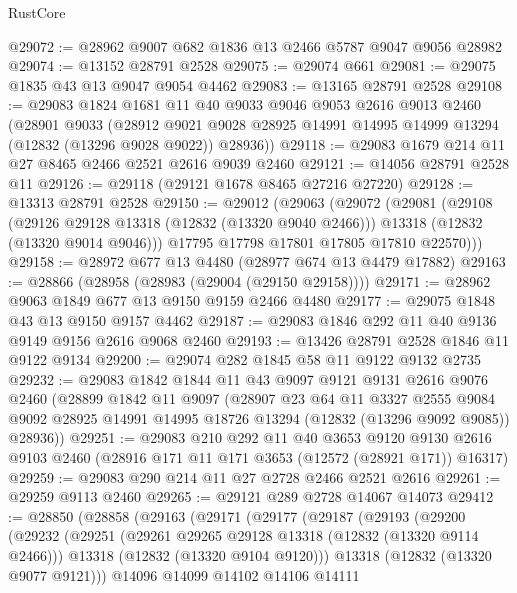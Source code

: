 \begin{lexlean}{RustCore}
\begin{coremodule}
@29072 := @28962 @9007 @682 @1836 @13 @2466 @5787 @9047 @9056 @28982
@29074 := @13152 @28791 @2528
@29075 := @29074 @661
@29081 := @29075 @1835 @43 @13 @9047 @9054 @4462
@29083 := @13165 @28791 @2528
@29108 := @29083
    @1824
    @1681
    @11
    @40
    @9033
    @9046
    @9053
    @2616
    @9013
    @2460
    (@28901
      @9033
      (@28912 @9021 @9028 @28925 @14991 @14995 @14999 @13294 (@12832 (@13296 @9028 @9022)) @28936))
@29118 := @29083 @1679 @214 @11 @27 @8465 @2466 @2521 @2616 @9039 @2460
@29121 := @14056 @28791 @2528 @11
@29126 := @29118 (@29121 @1678 @8465 @27216 @27220)
@29128 := @13313 @28791 @2528
@29150 := @29012
    (@29063
      (@29072
        (@29081
          (@29108
            (@29126 @29128 @13318 (@12832 (@13320 @9040 @2466)))
            @13318
            (@12832 (@13320 @9014 @9046)))
          @17795
          @17798
          @17801
          @17805
          @17810
          @22570)))
@29158 := @28972 @677 @13 @4480 (@28977 @674 @13 @4479 @17882)
@29163 := @28866 (@28958 (@28983 (@29004 (@29150 @29158))))
@29171 := @28962 @9063 @1849 @677 @13 @9150 @9159 @2466 @4480
@29177 := @29075 @1848 @43 @13 @9150 @9157 @4462
@29187 := @29083 @1846 @292 @11 @40 @9136 @9149 @9156 @2616 @9068 @2460
@29193 := @13426 @28791 @2528 @1846 @11 @9122 @9134
@29200 := @29074 @282 @1845 @58 @11 @9122 @9132 @2735
@29232 := @29083
    @1842
    @1844
    @11
    @43
    @9097
    @9121
    @9131
    @2616
    @9076
    @2460
    (@28899
      @1842
      @11
      @9097
      (@28907
        @23
        @64
        @11
        @3327
        @2555
        @9084
        @9092
        @28925
        @14991
        @14995
        @18726
        @13294
        (@12832 (@13296 @9092 @9085))
        @28936))
@29251 := @29083
    @210
    @292
    @11
    @40
    @3653
    @9120
    @9130
    @2616
    @9103
    @2460
    (@28916 @171 @11 @171 @3653 (@12572 (@28921 @171)) @16317)
@29259 := @29083 @290 @214 @11 @27 @2728 @2466 @2521 @2616
@29261 := @29259 @9113 @2460
@29265 := @29121 @289 @2728 @14067 @14073
@29412 := @28850
    (@28858
      (@29163
        (@29171
          (@29177
            (@29187
              (@29193
                (@29200
                  (@29232
                    (@29251
                      (@29261 @29265 @29128 @13318 (@12832 (@13320 @9114 @2466)))
                      @13318
                      (@12832 (@13320 @9104 @9120)))
                    @13318
                    (@12832 (@13320 @9077 @9121)))
                  @14096
                  @14099
                  @14102
                  @14106
                  @14111

\end{coremodule}
\end{lexlean}
